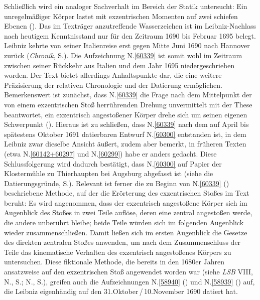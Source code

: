 Schließlich wird ein analoger Sachverhalt im Bereich der Statik untersucht: Ein unregelmäßiger Körper lastet mit exzentrischen Momenten auf zwei schiefen Ebenen (). 
Das im Texträger anzutreffende Wasserzeichen %
ist im Leibniz-Nachlass nach heutigem Kenntnisstand nur für den Zeitraum 1690 bis Februar 1695 belegt.
Leibniz kehrte von seiner Italienreise erst gegen Mitte Juni 1690 nach Hannover zurück (\textit{Chronik}, S.).\cite{01236}
Die Aufzeichnung N.\;\ref{60339} ist somit wohl im Zeitraum zwischen seiner Rückkehr aus Italien und dem Jahr 1695 niedergeschrieben worden.
Der Text bietet allerdings Anhaltspunkte dar, die eine weitere Präzisierung der relativen Chronologie und der Datierung ermöglichen.
\pend%
\pstart%
Bemerkenswert ist zunächst, dass %
N.\;\ref{60339} die Frage nach dem Mittelpunkt der von einem exzentrischen Stoß herrührenden Drehung unvermittelt mit der These beantwortet, ein exzentrisch angestoßener Körper drehe sich um seinen eigenen Schwerpunkt ().
Hieraus ist zu schließen, dass N.\;\ref{60339} nach dem auf April bis spätestens Oktober 1691 datierbaren Entwurf N.\;\ref{60300} entstanden ist, in dem Leibniz zwar dieselbe Ansicht äußert, zudem aber bemerkt, in früheren Texten (etwa N.\;\ref{60142+60297} und N.\;\ref{60299}) habe er anders gedacht.
Diese Schlussfolgerung wird dadurch bestätigt, dass N.\;\ref{60300} auf Papier der Klostermühle zu Thierhaupten bei Augsburg abgefasst ist (siehe die Datierungsgründe, S.\;\pageref{LH_37_05_044_datierung}).
\pend%
\pstart%
Relevant ist ferner die zu Beginn von N.\;\ref{60339} () beschriebene Methode, auf der die Erörterung des exzentrischen Stoßes im Text beruht:
Es wird angenommen, dass der exzentrisch angestoßene Körper sich im Augenblick des Stoßes in zwei Teile auflöse, deren eine zentral angestoßen werde, die andere unberührt bleibe; beide Teile würden sich im folgenden Augenblick wieder zusammenschließen.
Damit ließen sich im ersten Augenblick die Gesetze des direkten zentralen Stoßes anwenden, um nach dem Zusammenschluss der Teile das kinematische Verhalten des exzentrisch angestoßenes Körpers zu untersuchen. %
Diese fiktionale Methode, die bereits in den 1680er Jahren ansatzweise auf den exzentrischen Stoß angewendet worden war (siehe \textit{LSB} VIII, N., S.;\cite{01399} N., S.),\cite{01400} greifen auch die Aufzeichnungen N.\;\ref{58940} () und N.\;\ref{58939} () auf, die Leibniz eigenhändig auf den 31.\;Oktober\,/\,10.\;November 1690 datiert hat.
